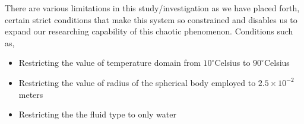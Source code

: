 {There are various limitations in this study/investigation as we have placed forth, certain strict conditions that make this system so constrained and disables us to expand our researching capability of this chaotic phenomenon. Conditions such as,}
        
    \begin{itemize}
        \item {Restricting the value of temperature domain from $10^\circ$Celsius to $90^\circ$Celsius}
        \item {Restricting the value of radius of the spherical body employed to $2.5\times10^{-2}$ meters}
        \item {Restricting the the fluid type to only water}
    \end{itemize}
        
        

